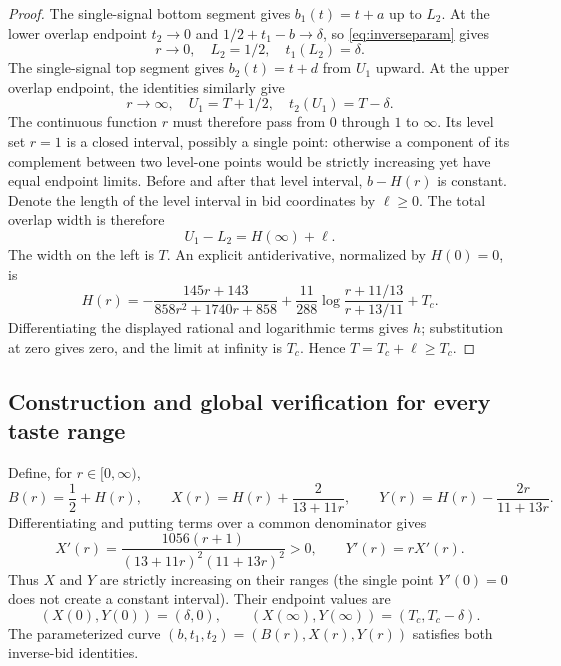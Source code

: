 \documentclass[11pt,a4paper]{article}
\theoremstyle{remark}\newtheorem{remark}[theorem]{Remark}
\begin{document}
\begin{proof}
The single-signal bottom segment gives $b_1(t)=t+a$ up to $L_2$. At the lower overlap endpoint $t_2\to0$ and $1/2+t_1-b\to\delta$, so \eqref{eq:inverseparam} gives
\[
 r\to0,\quad L_2=1/2,\quad t_1(L_2)=\delta.
\]
The single-signal top segment gives $b_2(t)=t+d$ from $U_1$ upward. At the upper overlap endpoint, the identities similarly give
\[
 r\to\infty,\quad U_1=T+1/2,\quad t_2(U_1)=T-\delta.
\]
The continuous function $r$ must therefore pass from $0$ through $1$ to $\infty$. Its level set $r=1$ is a closed interval, possibly a single point: otherwise a component of its complement between two level-one points would be strictly increasing yet have equal endpoint limits. Before and after that level interval, $b-H(r)$ is constant. Denote the length of the level interval in bid coordinates by $\ell\ge0$. The total overlap width is therefore
\[
 U_1-L_2=H(\infty)+\ell.
\]
The width on the left is $T$. An explicit antiderivative, normalized by $H(0)=0$, is
\begin{equation}\label{eq:H}
 H(r)=-\frac{145r+143}{858r^2+1740r+858}
 +\frac{11}{288}\log\!\frac{r+11/13}{r+13/11}+T_c.
\end{equation}
Differentiating the displayed rational and logarithmic terms gives $h$; substitution at zero gives zero, and the limit at infinity is $T_c$. Hence $T=T_c+\ell\ge T_c$.
\end{proof}

\subsection{Construction and global verification for every taste range}
Define, for $r\in[0,\infty)$,
\[
 B(r)=\frac12+H(r),\qquad
 X(r)=H(r)+\frac2{13+11r},\qquad
 Y(r)=H(r)-\frac{2r}{11+13r}.
\]
Differentiating and putting terms over a common denominator gives
\begin{equation}\label{eq:XYderivatives}
 X'(r)=\frac{1056(r+1)}{(13+11r)^2(11+13r)^2}>0,
 \qquad Y'(r)=rX'(r).
\end{equation}
Thus $X$ and $Y$ are strictly increasing on their ranges (the single point $Y'(0)=0$ does not create a constant interval). Their endpoint values are
\[
 (X(0),Y(0))=(\delta,0),\qquad
 (X(\infty),Y(\infty))=(T_c,T_c-\delta).
\]
The parameterized curve $(b,t_1,t_2)=(B(r),X(r),Y(r))$ satisfies both inverse-bid identities.
\end{document}
